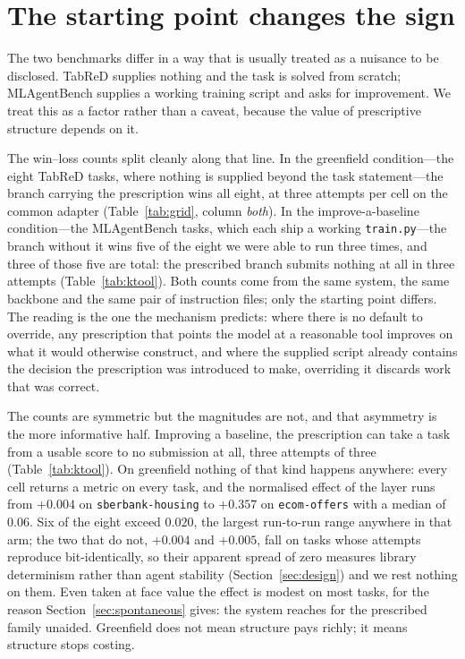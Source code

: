 \section{The starting point changes the sign}
\label{sec:starting}

The two benchmarks differ in a way that is usually treated as a nuisance to be
disclosed. TabReD supplies nothing and the task is solved from scratch;
MLAgentBench supplies a working training script and asks for improvement. We
treat this as a factor rather than a caveat, because the value of prescriptive
structure depends on it.

The win--loss counts split cleanly along that line. In the greenfield
condition---the eight TabReD tasks, where nothing is supplied beyond the task
statement---the branch carrying the prescription wins all eight, at three
attempts per cell on the common adapter (Table~\ref{tab:grid}, column
\emph{both}). In the improve-a-baseline condition---the MLAgentBench tasks,
which each ship a working \texttt{train.py}---the branch without it wins five of
the eight we were able to run three times, and three of those five are total:
the prescribed branch submits nothing at all in three attempts
(Table~\ref{tab:ktool}). Both counts come from
the same system, the same backbone and the same pair of instruction files; only
the starting point differs. The reading is the one the mechanism predicts: where
there is no default to override, any prescription that points the model at a
reasonable tool improves on what it would otherwise construct, and where the
supplied script already contains the decision the prescription was introduced to
make, overriding it discards work that was correct.

The counts are symmetric but the magnitudes are not, and that asymmetry is the
more informative half. Improving a baseline, the prescription can take a task
from a usable score to no submission at all, three attempts of three
(Table~\ref{tab:ktool}). On greenfield nothing of that kind happens anywhere:
every cell returns a metric on every task, and the normalised effect of the
layer runs from $+0.004$ on \texttt{sberbank-housing} to $+0.357$ on
\texttt{ecom-offers} with a median of $0.06$. Six of the eight exceed $0.020$,
the largest run-to-run range anywhere in that arm; the two that do not, $+0.004$
and $+0.005$, fall on tasks whose attempts reproduce bit-identically, so their
apparent spread of zero measures library determinism rather than agent stability
(Section~\ref{sec:design}) and we rest nothing on them. Even taken at face
value the effect is modest on most tasks, for the reason
Section~\ref{sec:spontaneous} gives: the system reaches for the prescribed
family unaided. Greenfield does not mean structure pays richly; it means
structure stops costing.

